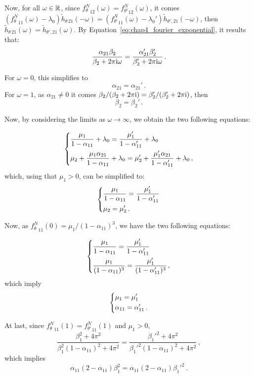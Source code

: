 \begin{subappendices}
Now, for all $\omega \in {\mathbb R}$, since ${f_\theta^N}_{12}(\omega) = {f_{\theta'}^N}_{12}(\omega)$, it comes $({f_\theta^N}_{11}(\omega) - \lambda_0)\tilde h_{\theta \, 21}(-\omega) = ({f_{\theta'}^N}_{11}(\omega) - \lambda_0')\tilde h_{\theta', 21}(-\omega)$, then $\tilde h_{\theta \, 21}(\omega) = \tilde h_{\theta', 21}(\omega)$.
By Equation~\eqref{eq:chap4_fourier_exponential}, it results that: 
\[
\frac{\alpha_{21} \beta_2}{\beta_2 + 2 \pi \mathrm{i} \omega} = \frac{\alpha_{21}' \beta_2'}{\beta_2' + 2 \pi \mathrm{i} \omega}\,.
\]

For $\omega = 0$, this simplifies to \[\alpha_{21} = \alpha_{21}'\,.\]
For $\omega = 1$, as $\alpha_{21} \neq 0$ it comes
${\beta_2}/(\beta_2 + 2 \pi \mathrm{i}) = {\beta_2'}/(\beta_2' + 2 \pi \mathrm{i})$, then
\[
\beta_2 = \beta_2' \,.
\]

Now, by considering the limits as $\omega \to \infty$, we obtain the two following equations:

\[\begin{dcases}
\frac{\mu_1}{1-\alpha_{11}} + \lambda_0 = \frac{\mu_1'}{1-\alpha_{11}'} + \lambda_0\\
\mu_2 + \frac{\mu_1 \alpha_{21}}{1-\alpha_{11}} + \lambda_0 = \mu_2' + \frac{\mu_1' \alpha_{21}}{1-\alpha_{11}'} + \lambda_0\,,
\end{dcases}
\]
which, using that $\mu_1 > 0$, can be simplified to:
\[
\begin{dcases}
\frac{\mu_1}{1-\alpha_{11}}= \frac{\mu_1'}{1-\alpha_{11}'}\\
\mu_2 = \mu_2'\,. 
\end{dcases}
\]

Now, as ${f_\theta^N}_{11}(0) = {\mu_1}/{(1-\alpha_{11})^3}$, we have the two following equations:

\[\begin{dcases}
\frac{\mu_1}{1-\alpha_{11}}= \frac{\mu_1'}{1-\alpha_{11}'}\\
\frac{\mu_1}{(1-\alpha_{11})^3} = \frac{\mu_1'}{(1-\alpha_{11}')^3} \,,
\end{dcases}
\]
which imply
\[
\begin{dcases}
\mu_1 = \mu_1'\\
\alpha_{11} = \alpha_{11}'\,.
\end{dcases}
\]

At last, since ${f_\theta^N}_{11}(1) = {f_{\theta'}^N}_{11}(1)$ and $\mu_1 > 0$,
\[
\frac{\beta_1^2 + 4 \pi^2}{\beta_1^2(1-\alpha_{11})^2 + 4\pi^2}
=
\frac{{\beta_1'}^2 + 4 \pi^2}{{\beta_1'}^2(1-\alpha_{11})^2 + 4\pi^2} \,,
\]
which implies
\[
\alpha_{11}(2 - \alpha_{11}) \beta_1^2
=
\alpha_{11}(2 - \alpha_{11}) {\beta_1'}^2 \,.
\]


\end{subappendices}
